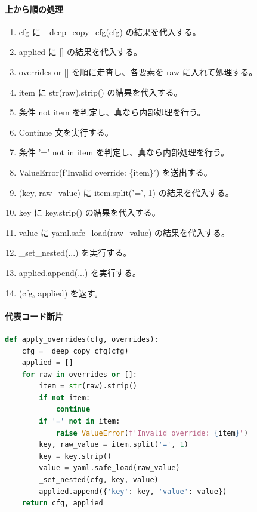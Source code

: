 \documentclass[a4paper,11pt]{article}
\begin{document}
            \paragraph{上から順の処理}
            \begin{enumerate}[leftmargin=1.8em]
            \item cfg に \_deep\_copy\_cfg(cfg) の結果を代入する。
\item applied に [] の結果を代入する。
\item overrides or [] を順に走査し、各要素を raw に入れて処理する。
\item   item に str(raw).strip() の結果を代入する。
\item   条件 not item を判定し、真なら内部処理を行う。
\item     Continue 文を実行する。
\item   条件 '=' not in item を判定し、真なら内部処理を行う。
\item     ValueError(f'Invalid override: \{item\}') を送出する。
\item   (key, raw\_value) に item.split('=', 1) の結果を代入する。
\item   key に key.strip() の結果を代入する。
\item   value に yaml.safe\_load(raw\_value) の結果を代入する。
\item   \_set\_nested(...) を実行する。
\item   applied.append(...) を実行する。
\item (cfg, applied) を返す。
            \end{enumerate}
            \paragraph{代表コード断片}
            \begin{lstlisting}[language=Python]
def apply_overrides(cfg, overrides):
    cfg = _deep_copy_cfg(cfg)
    applied = []
    for raw in overrides or []:
        item = str(raw).strip()
        if not item:
            continue
        if '=' not in item:
            raise ValueError(f'Invalid override: {item}')
        key, raw_value = item.split('=', 1)
        key = key.strip()
        value = yaml.safe_load(raw_value)
        _set_nested(cfg, key, value)
        applied.append({'key': key, 'value': value})
    return cfg, applied
\end{lstlisting}
\end{document}
